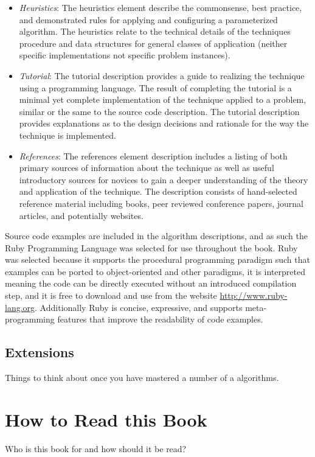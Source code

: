 \begin{itemize}
	\item \emph{Heuristics}: The heuristics element describe the commonsense, best practice, and demonstrated rules for applying and configuring a parameterized algorithm. The heuristics relate to the technical details of the techniques procedure and data structures for general classes of application (neither specific implementations not specific problem instances).
	\item \emph{Tutorial}: The tutorial description provides a guide to realizing the technique using a programming language. The result of completing the tutorial is a minimal yet complete implementation of the technique applied to a problem, similar or the same to the source code description. The tutorial description provides explanations as to the design decisions and rationale for the way the technique is implemented.
	\item \emph{References}: The references element description includes a listing of both primary sources of information about the technique as well as useful introductory sources for novices to gain a deeper understanding of the theory and application of the technique. The description consists of hand-selected reference material including books, peer reviewed conference papers, journal articles, and potentially websites.
\end{itemize}

Source code examples are included in the algorithm descriptions, and as such the Ruby Programming Language was selected for use throughout the book. Ruby was selected because it supports the procedural programming paradigm such that examples can be ported to object-oriented and other paradigms, it is interpreted meaning the code can be directly executed without an introduced compilation step, and it is free to download and use from the website \url{http://www.ruby-lang.org}. Additionally Ruby is concise, expressive, and supports meta-programming features that improve the readability of code examples.

% 
%
\subsection{Extensions}
Things to think about once you have mastered a number of a algorithms.



% 
% 
\section{How to Read this Book}
\label{intro:sec:how_to_read}
Who is this book for and how should it be read?

